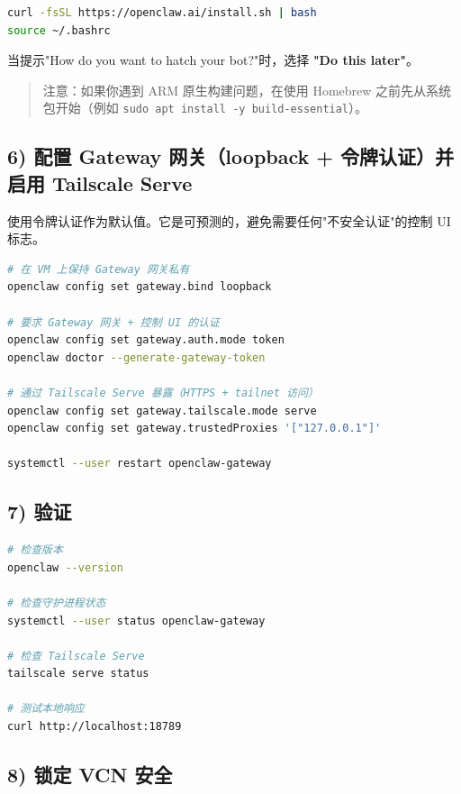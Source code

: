 \begin{lstlisting}[language=bash]
curl -fsSL https://openclaw.ai/install.sh | bash
source ~/.bashrc
\end{lstlisting}


当提示"How do you want to hatch your bot?"时，选择 \textbf{"Do this later"}。

\begin{quote}
注意：如果你遇到 ARM 原生构建问题，在使用 Homebrew 之前先从系统包开始（例如 \texttt{sudo apt install -y build-essential}）。
\end{quote}


\subsection{6) 配置 Gateway 网关（loopback + 令牌认证）并启用 Tailscale Serve}


使用令牌认证作为默认值。它是可预测的，避免需要任何"不安全认证"的控制 UI 标志。

\begin{lstlisting}[language=bash]
# 在 VM 上保持 Gateway 网关私有
openclaw config set gateway.bind loopback

# 要求 Gateway 网关 + 控制 UI 的认证
openclaw config set gateway.auth.mode token
openclaw doctor --generate-gateway-token

# 通过 Tailscale Serve 暴露（HTTPS + tailnet 访问）
openclaw config set gateway.tailscale.mode serve
openclaw config set gateway.trustedProxies '["127.0.0.1"]'

systemctl --user restart openclaw-gateway
\end{lstlisting}


\subsection{7) 验证}


\begin{lstlisting}[language=bash]
# 检查版本
openclaw --version

# 检查守护进程状态
systemctl --user status openclaw-gateway

# 检查 Tailscale Serve
tailscale serve status

# 测试本地响应
curl http://localhost:18789
\end{lstlisting}


\subsection{8) 锁定 VCN 安全}


